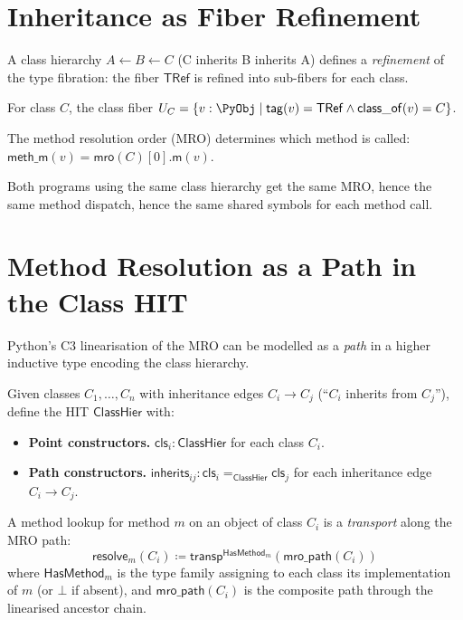 \section{Inheritance as Fiber Refinement}

A class hierarchy $A \leftarrow B \leftarrow C$ (C inherits B
inherits A) defines a \emph{refinement} of the type fibration:
the fiber $\mathsf{TRef}$ is refined into sub-fibers for each class.

\begin{definition}
For class $C$, the class fiber $U_C = \{v : \PyObj \mid
\mathsf{tag}(v) = \mathsf{TRef} \land \mathsf{class\_of}(v) = C\}$.

The method resolution order (MRO) determines which method is called:
$\mathsf{meth\_m}(v) = \mathsf{mro}(C)[0].\mathsf{m}(v)$.
\end{definition}

Both programs using the same class hierarchy get the same MRO,
hence the same method dispatch, hence the same shared symbols for
each method call.

\section{Method Resolution as a Path in the Class HIT}

Python's C3 linearisation of the MRO can be modelled as a
\emph{path} in a higher inductive type encoding the class hierarchy.

\begin{definition}
Given classes $C_1, \ldots, C_n$ with inheritance edges
$C_i \to C_j$ (``$C_i$ inherits from $C_j$''), define the HIT
$\mathsf{ClassHier}$ with:
\begin{itemize}
  \item \textbf{Point constructors.}
    $\mathsf{cls}_i : \mathsf{ClassHier}$ for each class $C_i$.
  \item \textbf{Path constructors.}
    $\mathsf{inherits}_{ij} : \mathsf{cls}_i =_{\mathsf{ClassHier}} \mathsf{cls}_j$
    for each inheritance edge $C_i \to C_j$.
\end{itemize}
\end{definition}

A method lookup for method $m$ on an object of class $C_i$ is a
\emph{transport} along the MRO path:
\[
  \mathsf{resolve}_m(C_i) \coloneqq
  \mathsf{transp}^{\mathsf{HasMethod}_m}(\mathsf{mro\_path}(C_i))
\]
where $\mathsf{HasMethod}_m$ is the type family assigning to each
class its implementation of $m$ (or $\bot$ if absent), and
$\mathsf{mro\_path}(C_i)$ is the composite path through the
linearised ancestor chain.

